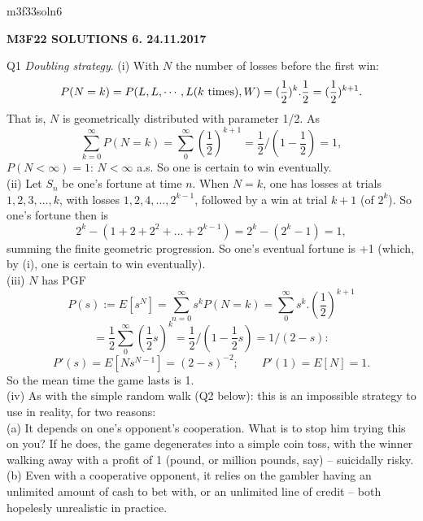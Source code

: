 \documentclass[12pt]{article}
\begin{document}
\def\R{\mathbb{R}}
\def\C{\mathbb{C}}
\def\Z{\mathbb{Z}}
\def\N{\mathbb{N}}
\def\Q{\mathbb{Q}}
\def\D{\mathbb{D}}
\def\Sp{{\mathbb{S}}}
\def\T{\mathbb{T}}
\def\H{\mathbb{H}}
\def\hb{\hfil \break}
\def\ni{\noindent}
\def\i{\indent}
\def\a{\alpha}
\def\b{\beta}
\def\e{\epsilon}
\def\d{\delta}
\def\D{\Delta}
\def\G{\Gamma}
\def\g{\gamma}
\def\l{\lambda}
\def\m{\mu}
\def\s{\sigma}
\def\Si{\Sigma}
\def\th{\theta}
\def\z{\zeta}
\def\p{\phi}
\def\o{\omega}
\def\O{\Omega}
\def\t{\tau}
\def\L{\it \char'44}
\def\F{\mathcal{F}}
\def\B{\mathcal{B}}
\def\C{\mathcal{C}}
\def\half{\frac{1}{2}}
\ni m3f33soln6 \\
\begin{center}
{\bf M3F22 SOLUTIONS 6.  24.11.2017} 
\end{center}

\ni Q1 {\it Doubling strategy}.  (i) With $N$ the number of losses before the first win:
$$
P(N = k) = P(L, L, \cdots, L (k \hbox{ times}), W) =(\half)^k.\half = (\half)^{k+1}.
$$
That is, $N$ is geometrically distributed with parameter 1/2. As
$$
\sum_{k=0}^{\infty} P(N = k) = \sum_0^{\infty} (\half)^{k+1} = \half/(1 - \half) = 1,
$$
$P(N < \infty) = 1$: $N < \infty$ a.s.  So one is certain to win eventually. \\
(ii) Let $S_n$ be one's fortune at time $n$.  When $N = k$, one has losses at trials $1, 2, 3, \ldots, k$, with losses $1,2, 4, \ldots, 2^{k-1}$, followed by a win at trial $k+1$ (of $2^k$).  So one's fortune then is
$$
2^k - (1 + 2 + 2^2 + \ldots + 2^{k-1}) = 2^k - (2^k - 1) = 1,
$$
summing the finite geometric progression.  So one's eventual fortune is +1 (which, by (i), one is certain to win eventually). \\
(iii) $N$ has PGF
$$
P(s)
:= E[s^N]
= \sum_{n=0}^{\infty} s^k P(N = k)
= \sum_0^{\infty} s^k.(\half)^{k+1}
$$
$$
= \half \sum_0^{\infty} (\half s)^k = \half/(1 - \half s) = 1/(2 - s):
$$
$$
P'(s) = E[N s^{N-1}] = (2 - s)^{-2}; \qquad P'(1) = E[N] = 1.
$$
So the mean time the game lasts is 1. \\
(iv) As with the simple random walk (Q2 below): this is an impossible strategy to use in reality, for two reasons: \\
(a) It depends on one's opponent's cooperation.  What is to stop him trying this on you?  If he does, the game degenerates into a simple coin toss, with the winner walking away with a profit of 1 (pound, or million pounds, say) -- suicidally risky. \\
(b) Even with a cooperative opponent, it relies on the gambler having an unlimited amount of cash to bet with, or an unlimited line of credit -- both hopelesly unrealistic in practice. \\
\end{document}
